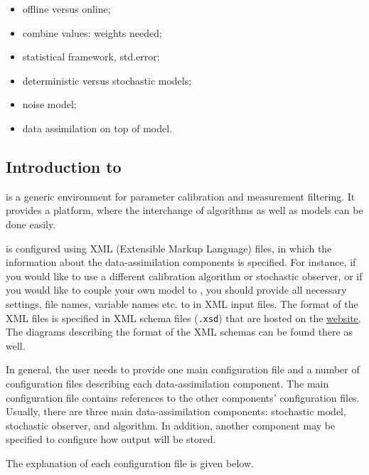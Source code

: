 \begin{itemize}
    \item offline versus online;
    \item combine values: weights needed;
    \item statistical framework, std.error;
    \item deterministic versus stochastic models;
    \item noise model;
    \item data assimilation on top of model.
\end{itemize}

\subsection{Introduction to \oda}
\oda is a generic environment for parameter calibration and measurement filtering. It provides a platform, where the interchange of algorithms as well as models can be done easily.

\oda is configured using XML (Extensible Markup Language) files, in which the information about the data-assimilation components is specified. For instance, if you would like to use a different calibration algorithm or stochastic observer, or if you would like to couple your own model to \oda, you should provide all necessary settings, file names, variable names etc. to \oda in XML input files. The format of the XML files is specified in XML schema files (\verb|.xsd|) that are hosted on the \href{http://openda.org/docu/openda_2.4/doc/xmlSchemasHTML/index.html}{\oda website}. The diagrams describing the format of the XML schemas can be found there as well. 

In general, the user needs to provide one main configuration file and a number of configuration files describing each data-assimilation component. The main configuration file contains references to the other components’ configuration files. Usually, there are three main data-assimilation components: stochastic model, stochastic observer, and algorithm. In addition, another component may be specified to configure how \oda output will be stored. 

The explanation of each configuration file is given below.

